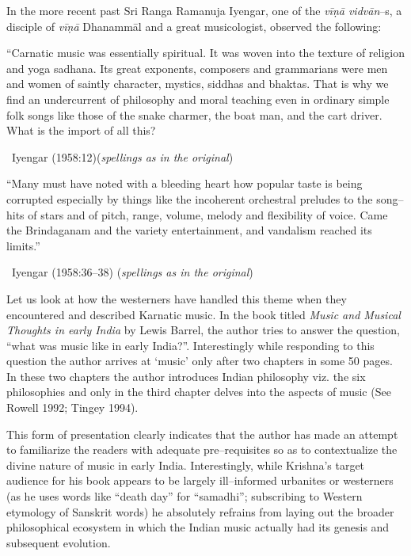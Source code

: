In the more recent past Sri Ranga Ramanuja Iyengar, one of the \textit{vīṇā vidvān}–s, a disciple of \textit{vīṇā} Dhanammāl and a great musicologist, observed the following:

\begin{myquote}
“Carnatic music was essentially spiritual. It was woven into the texture of religion and yoga sadhana. Its great exponents, composers and grammarians were men and women of saintly character, mystics, siddhas and bhaktas. That is why we find an undercurrent of philosophy and moral teaching even in ordinary simple folk songs like those of the snake charmer, the boat man, and the cart driver. What is the import of all this? 

~\hfill Iyengar (1958:12)(\textit{spellings as in the original})
\end{myquote}

\vspace{.1cm}

\begin{myquote}
“Many must have noted with a bleeding heart how popular taste is being corrupted especially by things like the incoherent orchestral preludes to the song–hits of stars and of pitch, range, volume, melody and flexibility of voice. Came the Brindaganam and the variety entertainment, and vandalism reached its limits.” 

~\hfill Iyengar (1958:36–38) (\textit{spellings as in the original})
\end{myquote}

Let us look at how the westerners have handled this theme when they encountered and described Karnatic music. In the book titled \textit{Music and Musical Thoughts in early India} by Lewis Barrel, the author tries to answer the question, “what was music like in early India?”. Interestingly while responding to this question the author arrives at ‘music’ only after two chapters in some 50 pages. In these two chapters the author introduces Indian philosophy viz. the six philosophies and only in the third chapter delves into the aspects of music (See Rowell 1992; Tingey 1994).

This form of presentation clearly indicates that the author has made an attempt to familiarize the readers with adequate pre–requisites so as to contextualize the divine nature of music in early India. Interestingly, while Krishna’s target audience for his book appears to be largely ill–informed urbanites or westerners (as he uses words like “death day” for “samadhi”; subscribing to Western etymology of Sanskrit words) he absolutely refrains from laying out the broader philosophical ecosystem in which the Indian music actually had its genesis and subsequent evolution.

